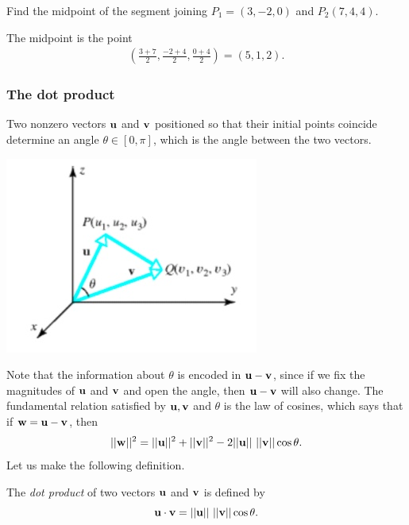 \documentclass[12pt,letterpaper,reqno]{article}
\numberwithin{equation}{section}
\newcommand{\ti}[1]{\textit{#1}}
\begin{document}
\begin{exercise}
Find the midpoint of the segment joining $P_1=(3,-2,0)$ and $P_2(7,4,4)$.	
\end{exercise}

{\color{red} 
The midpoint is the point
\begin{align*}
	\left(\frac{3+7}{2},\frac{-2+4}{2},\frac{0+4}{2}\right)=(5,1,2).
\end{align*}}

\subsubsection{The dot product}
Two nonzero vectors ${\bf u}$ and ${\bf v}$ positioned so that their initial points coincide determine an angle $\theta \in [0,\pi]$, which is the angle between the two vectors.
\begin{center}
	\includegraphics[scale=0.5]{figures_mvc/angle_uv}
\end{center}
Note that the information about $\theta$ is encoded in ${\bf u}-{\bf v}$, since if we fix the magnitudes of ${\bf u}$ and ${\bf v}$ and open the angle, then ${\bf u}-{\bf v}$ will also change. The fundamental relation satisfied by ${\bf u}, {\bf v}$ and $\theta$ is the law of cosines, which says that if ${\bf w}={\bf u}-{\bf v}$, then
\begin{equation}\label{eq:law_of_cosines}
	||{\bf w}||^2=||{\bf u}||^2+||{\bf v}||^2-2||{\bf u}|| \ ||{\bf v}||\cos \theta. 
\end{equation}
Let us make the following definition.
\begin{defn}
	The \ti{dot product} of two vectors ${\bf u}$ and ${\bf v}$ is defined by
	\begin{equation}\label{eq:dot_product_def}
		{\bf u}\cdot {\bf v}=||{\bf u}|| \ ||{\bf v}||\cos\theta.
	\end{equation} 
\end{defn}
\end{document}
